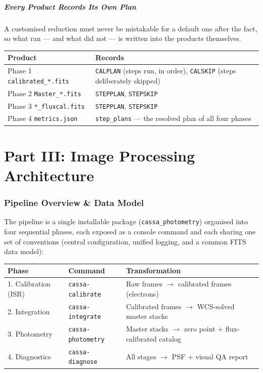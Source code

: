 \documentclass[11pt,a4paper]{article}
\begin{document}
\subsubsection{Every Product Records Its Own Plan}
A customised reduction must never be mistakable for a default one after the
fact, so what ran --- and what did not --- is written into the products
themselves.
\begin{center}
\begin{tabularx}{\textwidth}{|l|X|}
\hline
\textbf{Product} & \textbf{Records} \\
\hline
Phase 1 \texttt{calibrated\_*.fits} & \texttt{CALPLAN} (steps run, in order), \texttt{CALSKIP} (steps deliberately skipped) \\
\hline
Phase 2 \texttt{Master\_*.fits} & \texttt{STEPPLAN}, \texttt{STEPSKIP} \\
\hline
Phase 3 \texttt{*\_fluxcal.fits} & \texttt{STEPPLAN}, \texttt{STEPSKIP} \\
\hline
Phase 4 \texttt{metrics.json} & \texttt{step\_plans} --- the resolved plan of all four phases \\
\hline
\end{tabularx}
\end{center}

\newpage

\part*{Part III: Image Processing Architecture}

\section{Pipeline Overview \& Data Model}
The pipeline is a single installable package (\texttt{cassa\_photometry}) organised into four sequential phases, each exposed as a console command and each sharing one set of conventions (central configuration, unified logging, and a common FITS data model):
\begin{center}
\begin{tabularx}{\textwidth}{|l|l|X|}
\hline
\textbf{Phase} & \textbf{Command} & \textbf{Transformation} \\
\hline
1. Calibration (ISR) & \texttt{cassa-calibrate} & Raw frames $\rightarrow$ calibrated frames (electrons) \\
\hline
2. Integration & \texttt{cassa-integrate} & Calibrated frames $\rightarrow$ WCS-solved master stacks \\
\hline
3. Photometry & \texttt{cassa-photometry} & Master stacks $\rightarrow$ zero point + flux-calibrated catalog \\
\hline
4. Diagnostics & \texttt{cassa-diagnose} & All stages $\rightarrow$ PSF + visual QA report \\
\hline
\end{tabularx}
\end{center}
\end{document}
